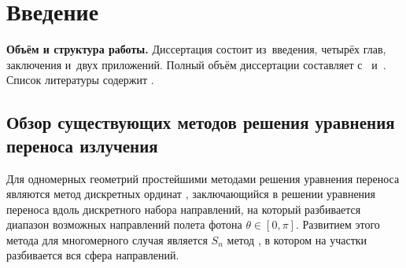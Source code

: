 \chapter*{Введение}							%



\textbf{Объём и структура работы.} Диссертация состоит из~введения, четырёх глав, заключения и~двух приложений.
%
Полный объём диссертации составляет  
с~
и~. Список литературы содержит  
.

\section*{Обзор существующих методов решения уравнения переноса излучения}

Для одномерных геометрий простейшими методами решения уравнения переноса являются метод дискретных ординат \cite{Wick1943,Chandrasekar195}, заключающийся в решении уравнения переноса вдоль дискретного набора направлений, на который разбивается диапазон возможных направлений полета фотона $\theta \in [0, \pi]$. Развитием этого метода для многомерного случая является $S_n$ метод \cite{Carlson1959}, в котором на участки разбивается вся сфера направлений.

